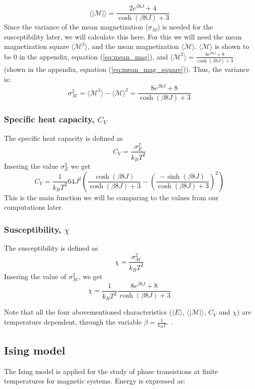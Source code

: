 \documentclass[../main.tex]{subfiles}
\begin{document}
\begin{equation*}
  \langle \mathcal{|M|} \rangle = \frac{ 2e^{\beta 8J} + 4}{\cosh(\beta 8J) + 3}
\end{equation*}
Since the variance of the mean magnetization ($\sigma_M$) is needed for the susceptibility later, we will calculate this here. For this we will need the mean magnetization square $\langle \mathcal{M}^2 \rangle$, and the mean magnetization $\langle \mathcal{M} \rangle$. $\langle \mathcal{M} \rangle$ is shown to be $0$ in the appendix, equation (\ref{eq:mean_mag}), and  $\langle \mathcal{M}^2 \rangle = \frac{8 e^{\beta8J} +  8}{\cosh(\beta 8J) + 3}$ (shown in the appendix, equation (\ref{eq:mean_mag_square})). Thus, the variance is:
\begin{equation*}
  \sigma^2_\mathcal{M} = \langle \mathcal{M}^2 \rangle - \langle \mathcal{M} \rangle ^2 = \frac{8 e^{\beta8J} +  8}{\cosh(\beta 8J) + 3}
\end{equation*}

\subsubsection*{Specific heat capacity, $C_V$}
The specific heat capacity is defined as
\[C_V = \frac{\sigma_E^2}{k_B T^2}\]
Insering the value $\sigma^2_E$ we get
\[C_V = \frac{1}{k_B T^2}64J^2\left(\frac{\cosh(\beta 8 J)}{\cosh(\beta 8 J) + 3} -\left(\frac{-\sinh(\beta 8 J)}{\cosh(\beta 8 J) + 3}\right)^2  \right)\]
This is the main function we will be comparing to the values from our computations later.

\subsubsection*{Susceptibility, $\chi$}
The susceptibility is defined as
\[\chi = \frac{\sigma^2_\mathcal{M}}{k_B T^2}\]
Insering the value of $\sigma^2_\mathcal{M}$, we get
\[\chi = \frac{1}{k_B T^2}\frac{8 e^{\beta8J} +  8}{\cosh(\beta 8J) + 3}\]

\noindent Note that all the four abovementioned characteristics ($\langle E\rangle$, $\langle |\mathcal M|\rangle$, $C_V$ and $\chi$) are temperature dependent, through the variable $\beta = \frac{1}{k_B T}$. \cite{Mortenstatphys2019}.

\subsection{Ising model}
The Ising model is applied for the study of phase transistions at finite temperatures
for magnetic systems. Energy is expressed as:
\end{document}
